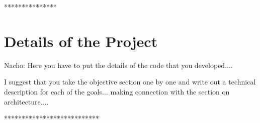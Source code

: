 ***************\section{Details of the Project}


Nacho:  Here you have to put the details of the code that you developed....


I suggest that you take the objective section one by one and write out 
a technical description for each of the goals... making connection with the 
section on architecture....


***************************






